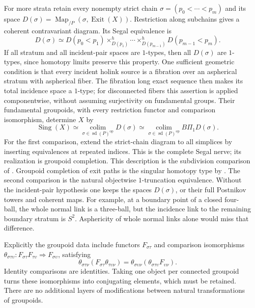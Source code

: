\documentclass[11pt,a4paper]{article}
\theoremstyle{definition}
\newcommand{\Map}{\operatorname{Map}}
\newcommand{\colim}{\operatorname*{colim}}
\begin{document}
For more strata retain every nonempty strict chain
$\sigma=(p_0<\cdots<p_m)$ and its space
$D(\sigma)=\Map_{/P}(\sigma,\operatorname{Exit}(X))$.
Restriction along subchains gives a coherent contravariant diagram.
Its Segal equivalence is
\[
 D(\sigma)\simeq D(p_0<p_1)\times^h_{D(p_1)}\cdots
       \times^h_{D(p_{m-1})}D(p_{m-1}<p_m).
\]
If all stratum and all incident-pair spaces are $1$-types, then all
$D(\sigma)$ are $1$-types, since homotopy limits preserve this
property. One sufficient geometric condition is that every incident
holink source is a fibration over an aspherical stratum with aspherical
fiber. The fibration long exact sequence then makes its total incidence
space a $1$-type; for disconnected fibers this assertion is applied
componentwise, without assuming surjectivity on fundamental groups. Their fundamental groupoids, with every restriction functor
and comparison isomorphism, determine $X$ by
\[
 \operatorname{Sing}(X)\simeq
 \colim_{\sigma\in\operatorname{sd}(P)^{\mathrm{op}}}D(\sigma)
 \simeq\colim_{\sigma\in\operatorname{sd}(P)^{\mathrm{op}}}
 B\Pi_1D(\sigma).
\]
For the first comparison, extend the strict-chain diagram to all
simplices by inserting equivalences at repeated indices. This is
the complete Segal nerve; its realization is groupoid completion.
This description is the subdivision comparison of
\cite[Lemma~2.7.3 and Theorem~2.7.4]{BGH}. Groupoid completion of
exit paths is the singular homotopy type by
\cite[Corollary~A.9.4]{Lurie}. The second comparison is the natural
objectwise $1$-truncation equivalence. Without the incident-pair
hypothesis one keeps the spaces $D(\sigma)$, or their full Postnikov
towers and coherent maps. For example, at a boundary point of a
closed four-ball, the whole normal link is a three-ball, but the
incidence link to the remaining boundary stratum is $S^2$.
Asphericity of whole normal links alone would miss that difference.

Explicitly the groupoid data include functors $F_{\sigma\tau}$
and comparison isomorphisms
$\theta_{\sigma\tau\upsilon}:F_{\sigma\tau}F_{\tau\upsilon}
\Rightarrow F_{\sigma\upsilon}$, satisfying
\[
 \theta_{\sigma\tau\nu}(F_{\sigma\tau}\theta_{\tau\upsilon\nu})
 =\theta_{\sigma\upsilon\nu}
   (\theta_{\sigma\tau\upsilon}F_{\upsilon\nu}).
\]
Identity comparisons are identities. Taking one object per connected
groupoid turns these isomorphisms into conjugating elements, which
must be retained. There are no additional layers of modifications
between natural transformations of groupoids.
\end{document}
